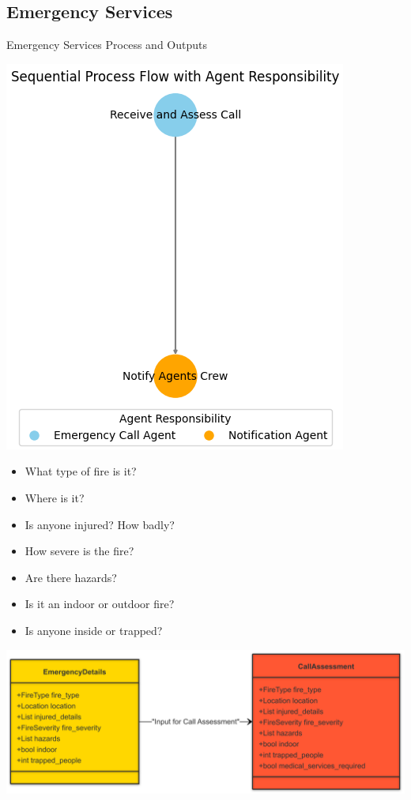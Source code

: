 \subsection{Emergency Services}
\begin{frame}{Emergency Services Process and Outputs}
        \begin{minipage}[b]{0.45\textwidth}
            \centering
            \includegraphics[width=0.75\linewidth]{figures/emergency_services_crew_flow.png}
        \end{minipage}
        \hfill
        \begin{minipage}[b]{0.5\textwidth}
            \begin{itemize}
                \item What type of fire is it?
                \item Where is it? 
                \item Is anyone injured? How badly? 
                \item How severe is the fire? 
                \item Are there hazards? 
                \item Is it an indoor or outdoor fire? 
                \item Is anyone inside or trapped? 
            \end{itemize}
            \vfill
        \end{minipage}
        \centering
            \includegraphics[width=0.7\linewidth]{figures/Emergency-Crew-Diagram.png}
\end{frame}


